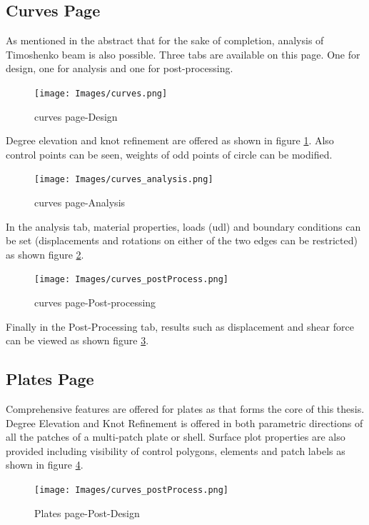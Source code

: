 \documentclass[12pt, a4paper]{report}
\begin{document}
\subsection{Curves Page}
As mentioned in the abstract that for the sake of completion, analysis of Timoshenko beam is also possible. Three tabs are available on this page. One for design, one for analysis and one for post-processing. 
\begin{figure}[H]
\centering
\texttt{[image: Images/curves.png]}
\caption{curves page-Design}
\label{fig:tumiga_curves_design}
\end{figure}
Degree elevation and knot refinement are offered as shown in figure \ref{fig:tumiga_curves_design}. Also control points can be seen, weights of odd points of circle can be modified.
\begin{figure}[H]
\centering
\texttt{[image: Images/curves\_analysis.png]}
\caption{curves page-Analysis}
\label{fig:curves_analysis}
\end{figure}
In the analysis tab, material properties, loads (udl) and boundary conditions can be set (displacements and rotations on either of the two edges can be restricted) as shown figure \ref{fig:curves_analysis}. 
\begin{figure}[H]
\centering
\texttt{[image: Images/curves\_postProcess.png]}
\caption{curves page-Post-processing}
\label{fig:curves_process}
\end{figure}
Finally in the Post-Processing tab, results such as displacement and shear force can be viewed as shown figure \ref{fig:curves_process}. 

\subsection{Plates Page}
Comprehensive features are offered for plates as that forms the core of this thesis. Degree Elevation and Knot Refinement is offered in both parametric directions of all the patches of a multi-patch plate or shell. Surface plot properties are also provided including visibility of control polygons, elements and patch labels as shown in figure \ref{fig:plate_design}. 
\begin{figure}[H]
\centering
\texttt{[image: Images/curves\_postProcess.png]}
\caption{Plates page-Post-Design}
\label{fig:plate_design}
\end{figure}
\end{document}
